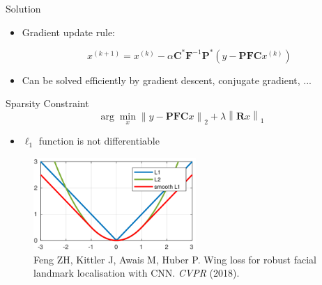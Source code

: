 \documentclass[aspectratio=169]{beamer}
\newcommand*{\norm}[1]{\left\lVert#1\right\rVert}
\newcommand{\argmin}{\arg\!\min}
\begin{document}
	\begin{frame}{Solution}
		\begin{itemize}
			\item Gradient update rule:
			
			\begin{equation}
				x^{(k+1)} = x^{(k)} - \alpha \mathbf{C}^* \mathbf{F}^{-1} \mathbf{P}^* (y - \mathbf{P}\mathbf{F}\mathbf{C}x^{(k)})
			\end{equation}
			
			\vspace{1em}
			\item Can be solved efficiently by gradient descent, conjugate gradient, ...
		\end{itemize}
	\end{frame}
	
	\begin{frame}{Sparsity Constraint}
		\begin{equation}
			\argmin_x \norm{y - \mathbf{P} \mathbf{F} \mathbf{C} x}_2 + \lambda \norm{\mathbf{R}x}_1
		\end{equation}
		
		\begin{itemize}
			\item $\ell_1$ function is not differentiable
		\end{itemize}
		\begin{figure}
			\centering
			\includegraphics[width=0.55\textwidth]{figures/l1-l2-plots.png}
			\captionsetup{labelformat=empty}
			\caption{{\tiny Feng ZH, Kittler J, Awais M, Huber P. Wing loss for robust facial landmark localisation with CNN. \textit{CVPR} (2018).}}
		\end{figure}
	\end{frame}
	
\end{document}
